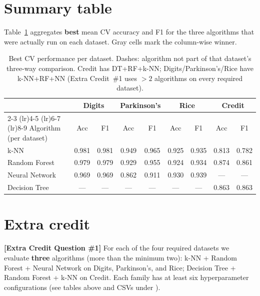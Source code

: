 \documentclass[11pt]{article}
\newcommand{\best}[1]{\cellcolor{gray!35}#1}
\newcommand{\filepath}[1]{\texttt{\detokenize{#1}}}
\begin{document}
\FloatBarrier
\section{Summary table}
Table~\ref{tab:main} aggregates \textbf{best} mean CV accuracy and F1 for the three algorithms that were actually run on each dataset. Gray cells mark the column-wise winner.

\begin{table}[htbp]
  \centering
  \small
  \setlength{\tabcolsep}{4pt}
  \begin{tabular}{l *{8}{c}}
    \toprule
    & \multicolumn{2}{c}{Digits} & \multicolumn{2}{c}{Parkinson's} & \multicolumn{2}{c}{Rice} & \multicolumn{2}{c}{Credit} \\
    \cmidrule(lr){2-3} \cmidrule(lr){4-5} \cmidrule(lr){6-7} \cmidrule(lr){8-9}
    Algorithm (per dataset) & Acc & F1 & Acc & F1 & Acc & F1 & Acc & F1 \\
    \midrule
    k-NN
      & \best{0.981} & \best{0.981}
      & \best{0.949} & \best{0.965}
      & 0.925 & 0.935
      & 0.813 & 0.782 \\
    Random Forest
      & 0.979 & 0.979
      & 0.929 & 0.955
      & 0.924 & 0.934
      & \best{0.874} & 0.861 \\
    Neural Network
      & 0.969 & 0.969
      & 0.862 & 0.911
      & \best{0.930} & \best{0.939}
      & --- & --- \\
    Decision Tree
      & --- & ---
      & --- & ---
      & --- & ---
      & 0.863 & \best{0.863} \\
    \bottomrule
  \end{tabular}
  \caption{Best CV performance per dataset. Dashes: algorithm not part of that dataset's three-way comparison. Credit has DT+RF+k-NN; Digits/Parkinson's/Rice have k-NN+RF+NN (Extra Credit~\#1 uses $>2$ algorithms on every required dataset).}
  \label{tab:main}
\end{table}
\newpage

\section{Extra credit}

{\color{red}\textbf{[Extra Credit Question \#1]}}
For each of the four required datasets we evaluate \textbf{three} algorithms (more than the minimum two): k-NN + Random Forest + Neural Network on Digits, Parkinson's, and Rice; Decision Tree + Random Forest + k-NN on Credit. Each family has at least six hyperparameter configurations (see tables above and CSVs under \filepath{outputs/}). \\
\end{document}
